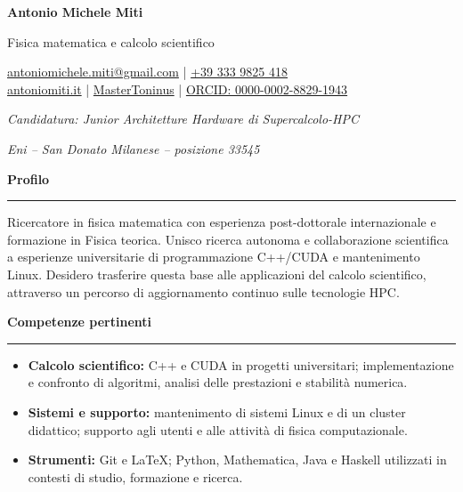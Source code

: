 \documentclass[10pt,a4paper]{article}
\newcommand{\cvsection}[1]{%
    \Needspace{4\baselineskip}%
    \vspace{0.8em}%
    {\large\bfseries\color{accent} #1}\par
    \vspace{0.2em}\hrule\vspace{0.45em}%
}
\begin{document}
{\Huge\bfseries Antonio Michele Miti}\par
\vspace{0.25em}
{\large\color{accent} Fisica matematica e calcolo scientifico}\par
    \vspace{0.1em}
    \begin{center}
        \href{mailto:antoniomichele.miti@gmail.com}{%
                \faEnvelope\enspace antoniomichele.miti@gmail.com}  |
        \href{tel:+393339825418}{\faPhone\enspace +39 333 9825 418} \\[3pt]
        \href{https://www.antoniomiti.it/}{\faGlobe\enspace antoniomiti.it} |
        \href{https://github.com/MasterToninus}{\faGithub\enspace MasterToninus} |
        \href{https://orcid.org/0000-0002-8829-1943}{%
            \faOrcid\enspace ORCID: 0000-0002-8829-1943}
    \end{center}
    \vspace{0.1em}
\textit{Candidatura: Junior Architetture Hardware di Supercalcolo-HPC}\par
\textit{Eni -- San Donato Milanese -- posizione 33545}\par

\cvsection{Profilo}
Ricercatore in fisica matematica con esperienza post-dottorale internazionale e formazione in Fisica teorica. Unisco ricerca autonoma e collaborazione scientifica a esperienze universitarie di programmazione C++/CUDA e mantenimento Linux. Desidero trasferire questa base alle applicazioni del calcolo scientifico, attraverso un percorso di aggiornamento continuo sulle tecnologie HPC.

\cvsection{Competenze pertinenti}
\begin{itemize}
    \item \textbf{Calcolo scientifico:} C++ e CUDA in progetti universitari; implementazione e confronto di algoritmi, analisi delle prestazioni e stabilità numerica.
    \item \textbf{Sistemi e supporto:} mantenimento di sistemi Linux e di un cluster didattico; supporto agli utenti e alle attività di fisica computazionale.
    \item \textbf{Strumenti:} Git e \LaTeX; Python, Mathematica, Java e Haskell utilizzati in contesti di studio, formazione e ricerca.
\end{itemize}
\end{document}
